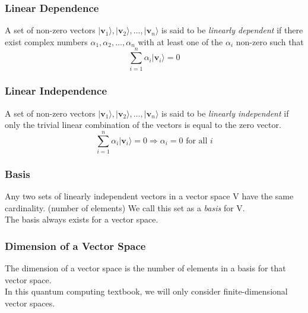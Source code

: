 \documentclass{article}
\begin{document}
\subsubsection{Linear Dependence}
A set of non-zero vectors $|\mathbf{v}_1\rangle, |\mathbf{v}_2\rangle, \ldots, |\mathbf{v}_n\rangle$ is said to be \textit{linearly dependent} 
if there exist complex numbers $\alpha_1, \alpha_2, \ldots, \alpha_n$ with at least one of the $\alpha_i$ non-zero such that
\begin{equation}
    \sum_{i=1}^n \alpha_i |\mathbf{v}_i\rangle = 0
\end{equation}
\subsubsection{Linear Independence}
A set of non-zero vectors $|\mathbf{v}_1\rangle, |\mathbf{v}_2\rangle, \ldots, |\mathbf{v}_n\rangle$ is said to be \textit{linearly independent}
if only the trivial linear combination of the vectors is equal to the zero vector.
\begin{equation}
    \sum_{i=1}^n \alpha_i |\mathbf{v}_i\rangle = 0 \Rightarrow \alpha_i = 0 \text{ for all } i
\end{equation}
\subsubsection{Basis}
Any two sets of linearly independent vectors in a vector space V have the same cardinality. (number of elements)  
We call this set as a \textit{basis} for V. \\
The basis always exists for a vector space. \\
\subsubsection{Dimension of a Vector Space}
The dimension of a vector space is the number of elements in a basis for that vector space. \\
In this quantum computing textbook, we will only consider finite-dimensional vector spaces. \\
\end{document}

